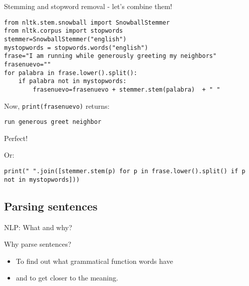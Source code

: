 \documentclass{beamer}
\begin{document}
\begin{frame}[fragile]{Stemming and stopword removal - let's combine them!}
\begin{lstlisting}
from nltk.stem.snowball import SnowballStemmer
from nltk.corpus import stopwords
stemmer=SnowballStemmer("english")
mystopwords = stopwords.words("english")
frase="I am running while generously greeting my neighbors"
frasenuevo=""
for palabra in frase.lower().split():
    if palabra not in mystopwords:
        frasenuevo=frasenuevo + stemmer.stem(palabra)  + " "
\end{lstlisting}
Now, {\tt{print(frasenuevo)}} returns:
\begin{lstlisting}
run generous greet neighbor
\end{lstlisting}
Perfect!

\pause
\small
Or:
\begin{lstlisting}
print(" ".join([stemmer.stem(p) for p in frase.lower().split() if p not in mystopwords]))
\end{lstlisting}


\end{frame}

{
\begin{frame}[plain]
\end{frame}
}



\subsection{Parsing sentences}
\begin{frame}{NLP: What and why?}
\begin{block}{Why parse sentences?}
\begin{itemize}
\item To find out what grammatical function words have
\item and to get closer to the meaning.
\end{itemize}
\end{block}
\end{frame}
\end{document}
